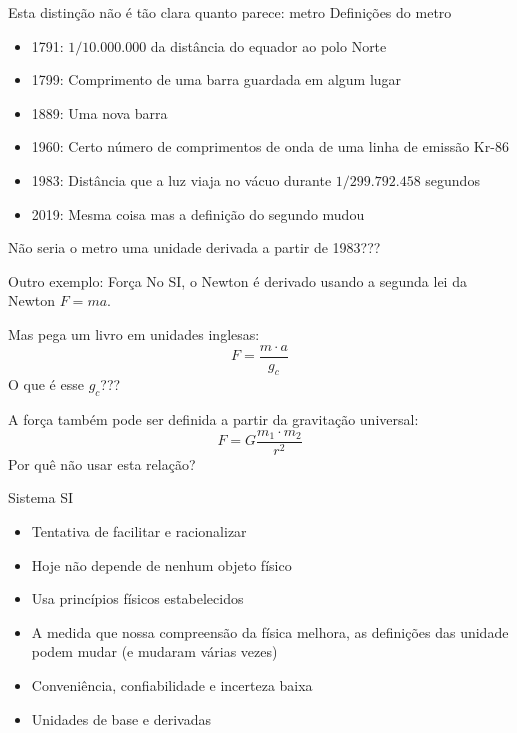 \documentclass{beamer}
\begin{document}
\begin{frame}{Esta distinção não é tão clara quanto parece: metro}
  Definições do metro
  \begin{itemize}
  \item 1791: $1/10.000.000$ da distância do equador ao polo Norte
  \item 1799: Comprimento de uma barra guardada em algum lugar
  \item 1889: Uma nova barra
  \item 1960: Certo número de comprimentos de onda de uma linha de emissão Kr-86
  \item 1983: Distância que a luz viaja no vácuo durante $1/299.792.458$ segundos
  \item 2019: Mesma coisa mas a definição do segundo mudou
  \end{itemize}
\vspace{0.5cm}
  Não seria o metro uma unidade derivada a partir de 1983???
   
\end{frame}

\begin{frame}{Outro exemplo: Força}
  No SI, o Newton é derivado usando a segunda lei da Newton $F=ma$.

  Mas pega um livro em unidades inglesas:
  \[
  F = \frac{m\cdot a}{g_c}
  \]
  O que é esse $g_c$???
  \vspace{0.5cm}
  
  A força também pode ser definida a partir da gravitação universal:
  \[
  F = G\frac{m_1\cdot m_2}{r^2}
  \]
  Por quê não usar esta relação?
  
\end{frame}

\begin{frame}{Sistema SI}
  \begin{itemize}
  \item Tentativa de facilitar e racionalizar
  \item Hoje não depende de nenhum objeto físico
  \item Usa princípios físicos estabelecidos
  \item A medida que nossa compreensão da física melhora, as definições das unidade podem mudar (e mudaram várias vezes)
  \item Conveniência, confiabilidade e incerteza baixa
  \item Unidades de base e derivadas
  \end{itemize}
\end{frame}
\end{document}
